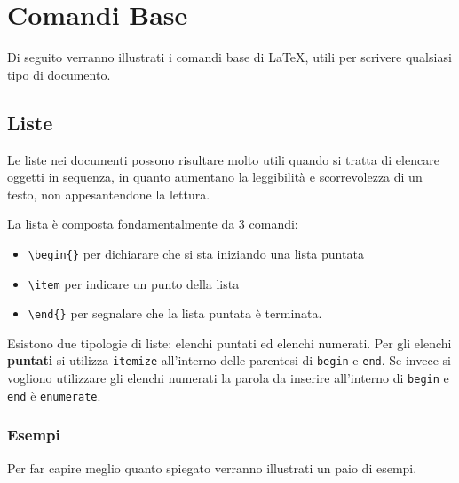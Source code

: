 \chapter{Comandi Base}

Di seguito verranno illustrati i comandi base di \LaTeX{}, utili per scrivere 
qualsiasi tipo di documento.

\section{Liste}

Le liste nei documenti possono risultare molto utili quando si tratta di 
elencare oggetti in sequenza, in quanto aumentano la leggibilità e 
scorrevolezza di un testo, non appesantendone la lettura.

La lista è composta fondamentalmente da 3 comandi:
\begin{itemize}
 \item \verb!\begin{}! per dichiarare che si sta iniziando una 
lista puntata
 \item \verb!\item! per indicare un punto della lista
 \item \verb!\end{}! per segnalare che la lista puntata è terminata.
\end{itemize}

Esistono due tipologie di liste: elenchi puntati ed elenchi numerati. Per gli 
elenchi \textbf{puntati} si utilizza \texttt{itemize} all'interno delle 
parentesi di \texttt{begin} e \texttt{end}. Se invece si vogliono utilizzare 
gli elenchi numerati la parola da inserire all'interno di \texttt{begin} e 
\texttt{end} è \texttt{enumerate}.

\subsection{Esempi}

Per far capire meglio quanto spiegato verranno illustrati un paio di esempi.

